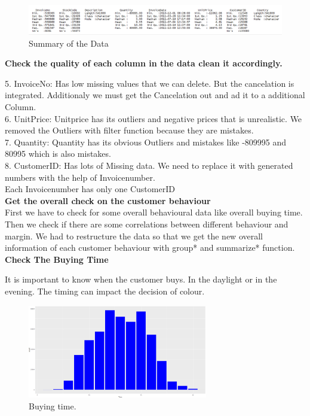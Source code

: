 \documentclass[11pt]{article}
\begin{document}
\begin{figure}[!htp]        
  \centering
    \includegraphics[width=1\textwidth]{pics/summary.jpg}
    \caption{Summary of the Data}
\end{figure}

{\large \textbf{Check the quality of each column in the data clean it accordingly.} }

5. InvoiceNo:    Has low missing values that we can delete. But the cancelation is integrated. Additionaly we must get the Cancelation out and ad it to a additional Column. \\      
6. UnitPrice:    Unitprice has its outliers and negative prices that is unrealistic. We removed the Outliers with filter function because they                are mistakes.\\  
7. Quantity:     Quantity has its obvious Outliers and mistakes like -809995 and 80995 which is also mistakes.  \\                
8. CustomerID:   Has lots of Missing data. We need to replace it with generated numbers with the help of Invoicenumber. \\ 
				 Each Invoicenumber has only one CustomerID\\


{\large\textbf{Get the overall check on the customer behaviour}} \\
First we have to check for some overall behavioural data like overall buying time.
Then we check if there are some correlations between different behaviour and margin.
We had to restructure the data so that we get the new overall information of each customer behaviour with group* and summarize* function. \\


\textbf{Check The Buying Time}

It is important to know when the customer buys. In the daylight or in the evening. The timing can impact the decision of colour.
\begin{figure}[!htp]        
  \centering
    \includegraphics[width=0.7\textwidth]{pics/timebuy.jpg}
    \caption{Buying time.}
\end{figure}
\end{document}
